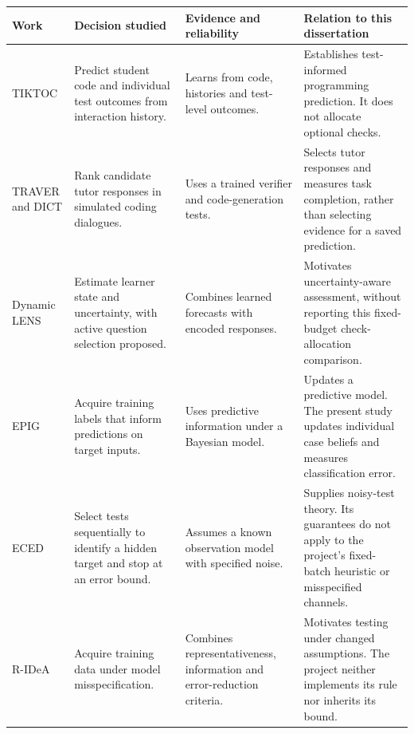 \begin{table}[htbp]
  \centering
  \small
  \begin{tabularx}{\textwidth}{@{}>{\raggedright\arraybackslash}p{}>{\raggedright\arraybackslash}p{}>{\raggedright\arraybackslash}p{}>{\raggedright\arraybackslash}X@{}}
    \toprule
    Work & Decision studied & Evidence and reliability & Relation to this dissertation \\
    \midrule
    TIKTOC \parencite{duan2025tiktoc}
      & Predict student code and individual test outcomes from interaction history.
      & Learns from code, histories and test-level outcomes.
      & Establishes test-informed programming prediction. It does not allocate optional checks. \\
    \addlinespace
    TRAVER and DICT \parencite{wang2025traver}
      & Rank candidate tutor responses in simulated coding dialogues.
      & Uses a trained verifier and code-generation tests.
      & Selects tutor responses and measures task completion, rather than selecting evidence for a saved prediction. \\
    \addlinespace
    Dynamic LENS \parencite{christie2024dynamiclens}
      & Estimate learner state and uncertainty, with active question selection proposed.
      & Combines learned forecasts with encoded responses.
      & Motivates uncertainty-aware assessment, without reporting this fixed-budget check-allocation comparison. \\
    \addlinespace
    EPIG \parencite{bickfordsmith2023prediction}
      & Acquire training labels that inform predictions on target inputs.
      & Uses predictive information under a Bayesian model.
      & Updates a predictive model. The present study updates individual case beliefs and measures classification error. \\
    \addlinespace
    ECED \parencite{chen2017noisy}
      & Select tests sequentially to identify a hidden target and stop at an error bound.
      & Assumes a known observation model with specified noise.
      & Supplies noisy-test theory. Its guarantees do not apply to the project's fixed-batch heuristic or misspecified channels. \\
    \addlinespace
    R-IDeA \parencite{tang2026robust}
      & Acquire training data under model misspecification.
      & Combines representativeness, information and error-reduction criteria.
      & Motivates testing under changed assumptions. The project neither implements its rule nor inherits its bound. \\

\end{tabularx}
\end{table}
